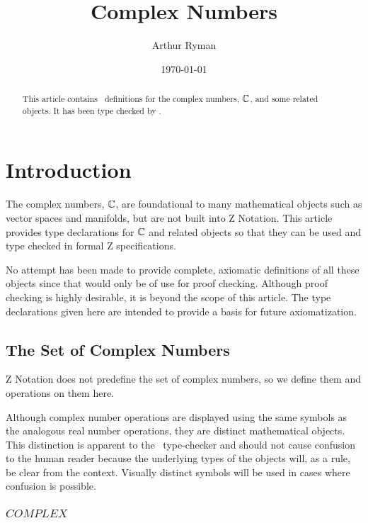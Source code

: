 \documentclass{amsart}
\begin{document}
\title{Complex Numbers}
\author{Arthur Ryman}
\date{\today}

\begin{abstract}
This article contains \ZN\ definitions for the complex numbers, $\mathbb{C}$, and some related objects.
It has been type checked by \fuzz.
\end{abstract}

\maketitle

\tableofcontents

\section{Introduction}

The complex numbers, $\mathbb{C}$, are foundational to many mathematical objects such as vector spaces and manifolds,
but are not built into Z Notation.
This article provides type declarations for $\mathbb{C}$ and related objects so that they can be used and type checked in formal Z specifications.

No attempt has been made to provide complete, axiomatic definitions of all these objects since that would only be of use for proof checking.
Although proof checking is highly desirable, it is beyond the scope of this article.
The type declarations given here are intended to provide a basis for future axiomatization.

\subsection{The Set of Complex Numbers}

Z Notation does not predefine the set of complex numbers, so we define
them and operations on them here.

Although complex number operations are displayed using the same symbols as the 
analogous real number operations,
they are distinct mathematical objects.
This distinction is apparent to the \fuzz\ type-checker and should not cause confusion to the human reader
because the underlying types of the objects will, as a rule, be clear from the context.
Visually distinct symbols will be used in cases where confusion is possible.

\subsubsection{$COMPLEX$}
\end{document}
